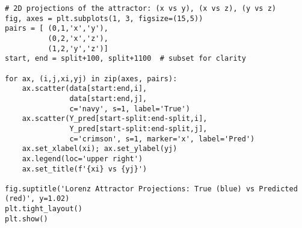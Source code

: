 \begin{verbatim}
# 2D projections of the attractor: (x vs y), (x vs z), (y vs z)
fig, axes = plt.subplots(1, 3, figsize=(15,5))
pairs = [ (0,1,'x','y'),
          (0,2,'x','z'),
          (1,2,'y','z')]
start, end = split+100, split+1100  # subset for clarity

for ax, (i,j,xi,yj) in zip(axes, pairs):
    ax.scatter(data[start:end,i],
               data[start:end,j],
               c='navy', s=1, label='True')
    ax.scatter(Y_pred[start-split:end-split,i],
               Y_pred[start-split:end-split,j],
               c='crimson', s=1, marker='x', label='Pred')
    ax.set_xlabel(xi); ax.set_ylabel(yj)
    ax.legend(loc='upper right')
    ax.set_title(f'{xi} vs {yj}')

fig.suptitle('Lorenz Attractor Projections: True (blue) vs Predicted (red)', y=1.02)
plt.tight_layout()
plt.show()
\end{verbatim}

